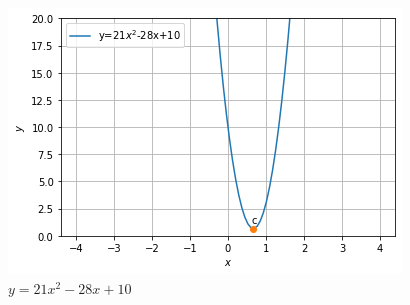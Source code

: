 \begin{enumerate}
    \begin{figure}[!ht]
    \centering
     \includegraphics[width=\columnwidth]{app/1/Figures/ChallengeProblem3_2.png}
    \caption{$y=21x^2-28x+10$}
    \label{quadform/app/1/ex1}	
    \end{figure}
    

\end{enumerate}
